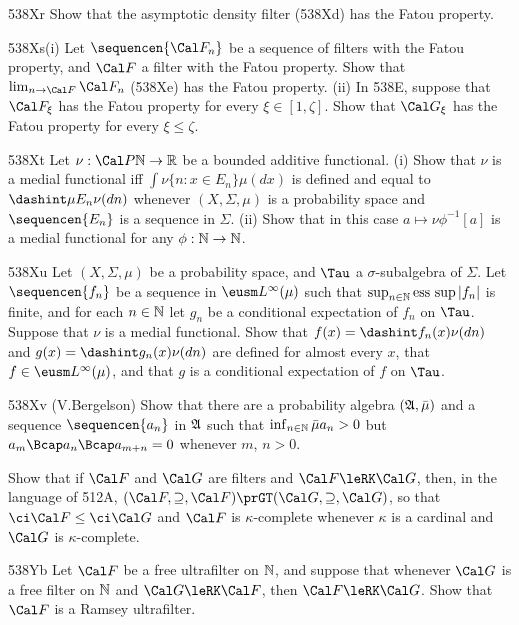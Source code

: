 {\spheader 538Xr
Show that the asymptotic density filter (538Xd) has the Fatou property.

\spheader 538Xs(i)
Let $\sequencen{\Cal F_n}$ be a sequence of filters with
the Fatou property, and $\Cal F$ a filter with the Fatou property.   Show
that $\lim_{n\to\Cal F}\Cal F_n$ (538Xe) has the Fatou property.
(ii) In 538E, suppose that $\Cal F_{\xi}$ has the Fatou property for every
$\xi\in[1,\zeta]$.
Show that $\Cal G_{\xi}$ has the Fatou property for every $\xi\le\zeta$.

\spheader 538Xt Let $\nu:\Cal P\Bbb N\to\Bbb R$ be a bounded additive
functional.   (i) Show that $\nu$ is a medial functional iff
$\int\nu\{n:x\in E_n\}\mu(dx)$ is defined and equal to
$\dashint\mu E_n\nu(dn)$ whenever
$(X,\Sigma,\mu)$ is a probability space and $\sequencen{E_n}$ is a sequence
in $\Sigma$.   (ii) Show that in this case $a\mapsto\nu\phi^{-1}[a]$ is a
medial functional for any $\phi:\Bbb N\to\Bbb N$.

\sqheader 538Xu Let $(X,\Sigma,\mu)$ be a probability space, and $\Tau$ a
$\sigma$-subalgebra of $\Sigma$.   Let $\sequencen{f_n}$ be a sequence in
$\eusm L^{\infty}(\mu)$ such that $\sup_{n\in\Bbb N}\mathop{\text{ess sup}}|f_n|$ is
finite, and for each $n\in\Bbb N$ let $g_n$ be a conditional expectation of
$f_n$ on $\Tau$.   Suppose that $\nu$ is a medial functional.   Show that
$f(x)=\dashint f_n(x)\nu(dn)$ and
$g(x)=\dashint g_n(x)\nu(dn)$ are defined for
almost every $x$, that $f\in\eusm L^{\infty}(\mu)$, and that $g$ is a
conditional expectation of $f$ on $\Tau$.

\spheader 538Xv (V.Bergelson) Show that there are a probability algebra
$(\frak A,\bar\mu)$ and a sequence $\sequencen{a_n}$ in $\frak A$ such that
$\inf_{n\in\Bbb N}\bar\mu a_n\penalty-100>0$
but $a_m\Bcap a_n\Bcap a_{m+n}=0$ whenever
$m$, $n>0$.   

Show that if $\Cal F$ and $\Cal G$ are
filters and $\Cal F\leRK\Cal G$, then, in the language of
512A, $(\Cal F,\supseteq,\Cal F)\prGT(\Cal G,\supseteq,\Cal G)$, so that
$\ci\Cal F\le\ci\Cal G$ and $\Cal F$ is $\kappa$-complete whenever
$\kappa$ is a cardinal and $\Cal G$ is $\kappa$-complete.

\spheader 538Yb
Let $\Cal F$ be a free ultrafilter on $\Bbb N$, and suppose
that whenever $\Cal G$ is a free filter on $\Bbb N$ and
$\Cal G\leRK\Cal F$, then $\Cal F\leRK\Cal G$.   Show that $\Cal F$ is a
Ramsey ultrafilter.    %

}
